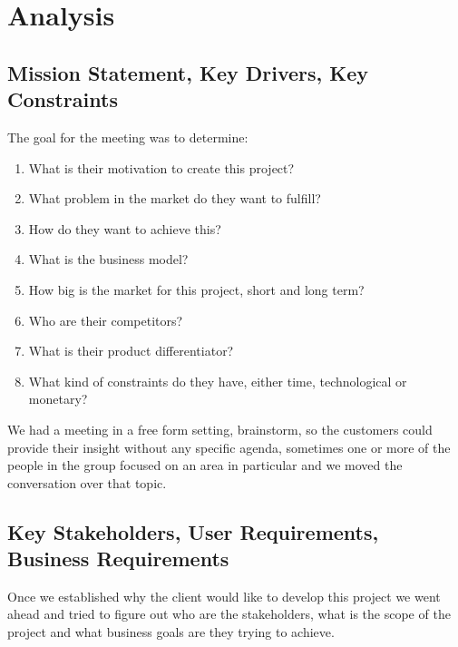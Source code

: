 \section{Analysis}
\subsection{Mission Statement, Key Drivers, Key Constraints}
The goal for the meeting was to determine:

\begin{enumerate}
    \item What is their motivation to create this project?
    \item What problem in the market do they want to fulfill?
    \item How do they want to achieve this?
    \item What is the business model?
    \item How big is the market for this project, short and long term?
    \item Who are their competitors?
    \item What is their product differentiator?
    \item What kind of constraints do they have, either time, 
    technological or monetary?
\end{enumerate}

\noindent We had a meeting in a free form setting, brainstorm, so the customers could 
provide their insight without any specific agenda, sometimes one or more of the 
people in the group focused on an area in particular and we moved the 
conversation over that topic.

\pagebreak
\subsection{Key Stakeholders, User Requirements, Business Requirements}
Once we established why the client would like to develop this project we went 
ahead and tried to figure out who are the stakeholders, what is the scope of 
the project and what business goals are they trying to achieve. \linebreak

